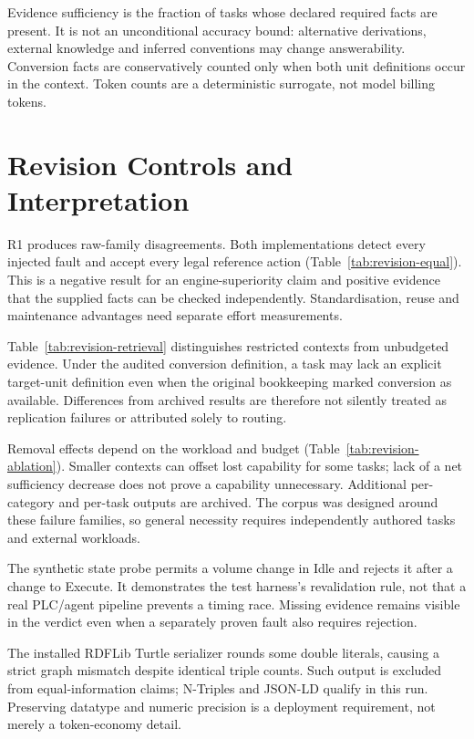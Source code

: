 \documentclass[10pt,journal,letterpaper]{IEEEtran}
\begin{document}
Evidence sufficiency is the fraction of tasks whose declared required facts are
present. It is not an unconditional accuracy bound: alternative derivations,
external knowledge and inferred conventions may change answerability. Conversion
facts are conservatively counted only when both unit definitions occur in the
context. Token counts are a deterministic surrogate, not model billing tokens.


\section{Revision Controls and Interpretation}

R1 produces \RevisionDisagreements{} raw-family disagreements. Both implementations
detect every injected fault and accept every legal reference action
(Table~\ref{tab:revision-equal}). This is a negative result for an
engine-superiority claim and positive evidence that the supplied facts can be
checked independently. Standardisation, reuse and maintenance advantages need
separate effort measurements.


Table~\ref{tab:revision-retrieval} distinguishes restricted contexts from
unbudgeted evidence. Under the audited conversion definition, a task may lack
an explicit target-unit definition even when the original bookkeeping marked
conversion as available. Differences from archived results are therefore not
silently treated as replication failures or attributed solely to routing.


Removal effects depend on the workload and budget
(Table~\ref{tab:revision-ablation}). Smaller contexts can offset lost capability
for some tasks; lack of a net sufficiency decrease does not prove a capability
unnecessary. Additional per-category and per-task outputs are archived. The
corpus was designed around these failure families, so general necessity requires
independently authored tasks and external workloads.


The synthetic state probe permits a volume change in Idle and rejects it after
a change to Execute. It demonstrates the test harness's revalidation rule, not
that a real PLC/agent pipeline prevents a timing race. Missing evidence remains
visible in the verdict even when a separately proven fault also requires rejection.


The installed RDFLib Turtle serializer rounds some double literals, causing a
strict graph mismatch despite identical triple counts. Such output is excluded
from equal-information claims; N-Triples and JSON-LD qualify in this run.
Preserving datatype and numeric precision is a deployment requirement, not
merely a token-economy detail.
\end{document}
